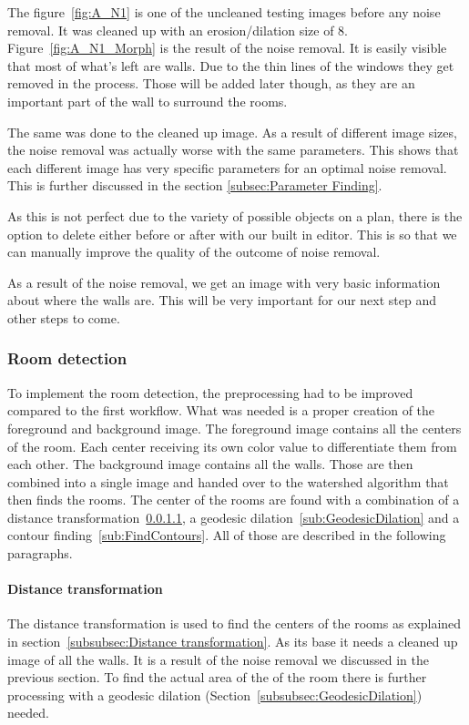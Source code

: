 The figure~\ref{fig:A_N1} is one of the uncleaned testing images before any noise removal. It was cleaned up with an erosion/dilation size of 8. Figure~\ref{fig:A_N1_Morph} is the result of the noise removal. It is easily visible that most of what's left are walls. Due to the thin lines of the windows they get removed in the process. Those will be added later though, as they are an important part of the wall to surround the rooms.

The same was done to the cleaned up image. As a result of different image sizes, the noise removal was actually worse with the same parameters. This shows that each different image has very specific parameters for an optimal noise removal. This is further discussed in the section \ref{subsec:Parameter Finding}. 

As this is not perfect due to the variety of possible objects on a plan, there is the option to delete either before or after with our built in editor. This is so that we can manually improve the quality of the outcome of noise removal.

As a result of the noise removal, we get an image with very basic information about where the walls are. This will be very important for our next step and other steps to come.


\subsubsection{Room detection}
To implement the room detection, the preprocessing had to be improved compared to the first workflow. What was needed is a proper creation of the foreground and background image. The foreground image contains all the centers of the room. Each center receiving its own color value to differentiate them from each other. The background image contains all the walls. Those are then combined into a single image and handed over to the watershed algorithm that then finds the rooms. The center of the rooms are found with a combination of a distance transformation~\ref{sub:DistanceTransformation}, a geodesic dilation~\ref{sub:GeodesicDilation} and a contour finding~\ref{sub:FindContours}. All of those are described in the following paragraphs.

\paragraph{Distance transformation}
\label{sub:DistanceTransformation}
The distance transformation is used to find the centers of the rooms as explained in section~\ref{subsubsec:Distance transformation}. As its base it needs a cleaned up image of all the walls. It is a result of the noise removal we discussed in the previous section. To find the actual area of the of the room there is further processing with a geodesic dilation (Section~\ref{subsubsec:GeodesicDilation}) needed.

